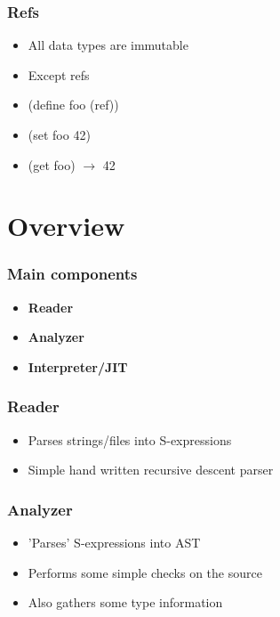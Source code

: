 \documentclass{beamer}
\begin{document}
	\begin{frame}
		\frametitle{Refs}

		\begin{itemize}
			\itemsep12pt

			\item All data types are immutable
			\item Except refs
			\item (define foo (ref))
			\item (set foo 42)
			\item (get foo) $\rightarrow$ 42
		\end{itemize}
	\end{frame}


	\section{Overview}


	\begin{frame}
		\frametitle{Main components}

		\begin{itemize}
			\itemsep12pt

			\item \textbf{Reader}
			\item \textbf{Analyzer}
			\item \textbf{Interpreter/JIT}
		\end{itemize}
	\end{frame}

	\begin{frame}
		\frametitle{Reader}

		\begin{itemize}
			\itemsep12pt
		
			\item Parses strings/files into S-expressions
			\item Simple hand written recursive descent parser
		\end{itemize}
	\end{frame}

	\begin{frame}
		\frametitle{Analyzer}

		\begin{itemize}
			\itemsep12pt
		
			\item 'Parses' S-expressions into AST
			\item Performs some simple checks on the source
			\item Also gathers some type information
		\end{itemize}
	\end{frame}
\end{document}
